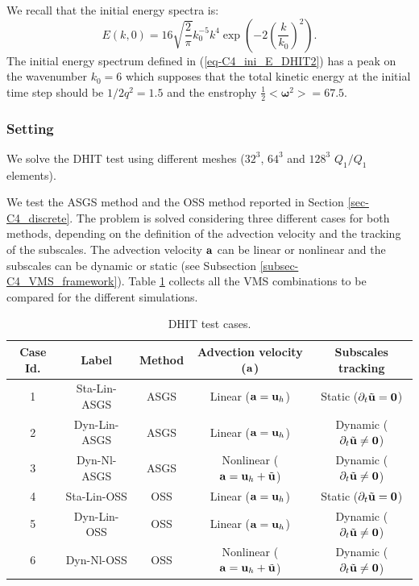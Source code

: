 We recall that the initial energy spectra is:
\begin{equation}
\label{eq-C4_ini_E_DHIT2}
E(k,0)=16\sqrt{\frac{2}{\pi}}k_0^{-5}k^4\exp\left(-2\left(\frac{k}{k_0}\right)^2\right).
\end{equation}
The initial energy spectrum defined in (\ref{eq-C4_ini_E_DHIT2}) has a peak on the wavenumber $k_0=6$ which supposes that the total kinetic energy at the initial time step should be $1/2q^2=1.5$ and the enstrophy $\frac{1}{2}<\boldsymbol{\omega}^2>=67.5$.

\subsubsection{Setting}
\label{subsubsec-C4_DHIT_setting}
We solve the DHIT test using different meshes ($32^3$, $64^3$ and $128^3$ $Q_1/Q_1$ elements). 

We test the ASGS method and the OSS method reported in Section \ref{sec-C4_discrete}. The problem is solved considering three different cases for both methods, depending on the definition of the advection velocity and the tracking of the subscales. The advection velocity ${\bf a}$ can be linear or nonlinear and the subscales can be dynamic or static (see Subsection \ref{subsec-C4_VMS_framework}). Table \ref{table:DHIT_cases} collects all the VMS combinations to be compared for the different simulations.

\begin{table}[h]
\centering
\begin{tabular}{ccccc}
\toprule
Case Id.&Label&Method&Advection velocity (${\bf a}$)&Subscales tracking\\
\midrule
\midrule
1&Sta-Lin-ASGS&ASGS&Linear (${\bf a}={\bf u}_h$)&Static ($\partial_t\tilde{{\bf u}} = {\bf 0}$)\\
2&Dyn-Lin-ASGS&ASGS&Linear (${\bf a}={\bf u}_h$)&Dynamic ($\partial_t\tilde{{\bf u}} \not = {\bf 0}$)\\
3&Dyn-Nl-ASGS&ASGS&Nonlinear (${\bf a}={\bf u}_h+\tilde{{\bf u}}$)&Dynamic ($\partial_t\tilde{{\bf u}} \not = {\bf 0}$)\\
\midrule
4&Sta-Lin-OSS&OSS&Linear (${\bf a}={\bf u}_h$)&Static ($\partial_t\tilde{{\bf u}} = {\bf 0}$)\\
5&Dyn-Lin-OSS&OSS&Linear (${\bf a}={\bf u}_h$)&Dynamic ($\partial_t\tilde{{\bf u}} \not = {\bf 0}$)\\
6&Dyn-Nl-OSS&OSS&Nonlinear (${\bf a}={\bf u}_h+\tilde{{\bf u}}$)&Dynamic ($\partial_t\tilde{{\bf u}} \not = {\bf 0}$)\\
\bottomrule
\end{tabular}
\caption{DHIT test cases.}
\label{table:DHIT_cases}
\end{table}

